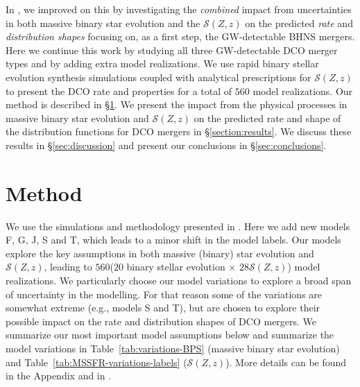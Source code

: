 \documentclass[fleqn,usenatbib]{mnras}
\newcommand{\SFRD}{\ensuremath{\mathcal{S}(Z,z)}\xspace}
\newcommand{\Nmodels}{\ensuremath{560}\xspace}
\newcommand{\NmodelsBPS}{\ensuremath{20}\xspace}
\newcommand{\NmodelsMSSFR}{\ensuremath{28}\xspace}
\begin{document}
In \citet[][from hereon  ]{Broekgaarden:2021},  we improved on this by investigating the \emph{combined} impact from uncertainties in both massive binary star evolution and the \SFRD on the predicted \emph{rate} and \emph{distribution shapes} focusing on, as a first step, the \ac{GW}-detectable \ac{BHNS} mergers. Here we continue this work by studying all three \ac{GW}-detectable \ac{DCO} merger types and by adding extra model realizations.
We use rapid binary stellar evolution synthesis simulations coupled with analytical prescriptions for \SFRD to present the \ac{DCO} rate and properties for a total of \Nmodels model realizations. Our method is described in \S\ref{sec:method}. We present the impact from the physical processes in massive binary star evolution and \SFRD on the predicted rate and shape of the distribution functions for \ac{DCO} mergers in \S\ref{section:results}. We discuss these results in \S\ref{sec:discussion} and present our conclusions in \S\ref{sec:conclusions}. 








\section{Method}
\label{sec:method}
%
We use the simulations and methodology presented in  . Here we add new models F, G, J, S and T, which leads to a minor shift in the model labels. Our models explore the key assumptions in both massive (binary) star evolution and \SFRD, leading to \Nmodels  (\NmodelsBPS binary stellar evolution $\times$ \NmodelsMSSFR \SFRD) model realizations. We particularly choose our model variations to explore a broad span of uncertainty in the modelling. For that reason some of the variations are somewhat extreme (e.g., models S and T), but are chosen to explore their possible impact on the rate and distribution shapes of \ac{DCO} mergers. We summarize our most important model assumptions below and summarize the model variations in Table~\ref{tab:variations-BPS}  (massive binary star evolution) and Table~\ref{tab:MSSFR-variations-labels} (\SFRD).  More details can be found in the Appendix and in  .
\end{document}
